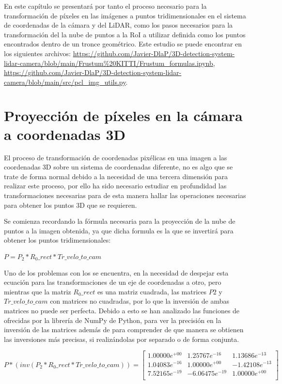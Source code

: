 En este capítulo se presentará por tanto el proceso necesario para la transformación de píxeles en las imágenes a puntos tridimensionales en el sistema de coordenadas de la cámara y del \ac{LiDAR}, como los pasos necesarios para la transformación del la nube de puntos a la \ac{RoI} a utilizar definida como los puntos encontrados dentro de un tronce geométrico. Este estudio se puede encontrar en los siguientes archivos: \url{https://github.com/Javier-DlaP/3D-detection-system-lidar-camera/blob/main/Frustum\%20KITTI/Frustum_formulas.ipynb}, \url{https://github.com/Javier-DlaP/3D-detection-system-lidar-camera/blob/main/src/pcl_img_utils.py}.

\section{Proyección de píxeles en la cámara a coordenadas 3D}
\label{sec:Proyección de píxeles en la cámara a coordenadas 3D}

El proceso de transformación de coordenadas pixélicas en una imagen a las coordenadas 3D sobre un sistema de coordenadas diferente, no es algo que se trate de forma normal debido a la necesidad de una tercera dimensión para realizar este proceso, por ello ha sido necesario estudiar en profundidad las transformaciones necesarias para de esta manera hallar las operaciones necesarias para obtener los puntos 3D que se requieren.

Se comienza recordando la fórmula necesaria para la proyección de la nube de puntos a la imagen obtenida, ya que dicha formula es la que se invertirá para obtener los puntos tridimensionales:

\begin{center}
$P = P_2 * R_0\_rect * Tr\_velo\_to\_cam$
\end{center}

Uno de los problemas con los se encuentra, en la necesidad de despejar esta ecuación para las transformaciones de un eje de coordenadas a otro, pero mientras que la matriz $R_0\_rect$ es una matriz cuadrada, las matrices $P2$ y $Tr\_velo\_to\_cam$ con matrices no cuadradas, por lo que la inversión de ambas matrices no puede ser perfecta. Debido a esto se han analizado las funciones de ofrecidas por la librería de NumPy de Python, para ver la precisión en la inversión de las matrices además de para comprender de que manera se obtienen las inversiones más precisas, si realizándolas por separado o de forma conjunta.

\begin{center}
$
P * (inv(P_2 * R_0\_rect * Tr\_velo\_to\_cam)) =
\begin{bmatrix}
1.00000e^{+00} & 1.25767e^{-16} & 1.13686e^{-13} \\
1.04083e^{-16} & 1.00000e^{+00} & -1.42108e^{-13} \\
7.52165e^{-19} & -6.06475e^{-19} & 1.00000e^{+00} \\
\end{bmatrix}
$
\end{center}

